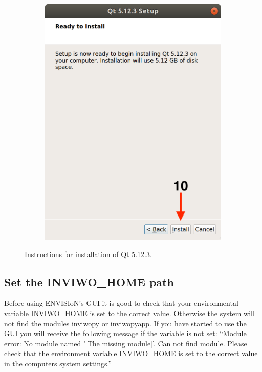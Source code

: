 \begin{figure}[H]
\begin{subfigure}{0.32\linewidth}
        \includegraphics[width=1\textwidth]{Images/Qt8.png}
    \end{subfigure}
    \caption{Instructions for installation of Qt 5.12.3.}
    \label{fig:Qt}
\end{figure}

\subsection{Set the INVIWO\_HOME path}
Before using ENVISIoN's GUI it is good to check that your environmental variable INVIWO\_HOME is set to the correct value. Otherwise the system will not find the modules inviwopy or inviwopyapp. If you have started to use the GUI you will receive the following message if the variable is not set:
\newline 
``Module error: No module named '[The missing module]'. Can not find module. Please check that the environment variable INVIWO\_HOME is set to the correct value in the computers system settings.''
\newline


